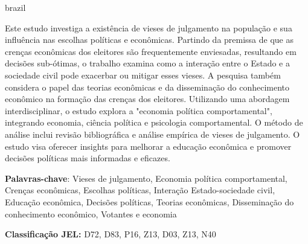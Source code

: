 \documentclass[
	article,
	12pt,
	oneside,
	a4paper,
	english,
	brazil,
	sumario=tradicional
]{abntex2}
\begin{document}
\renewcommand{\resumoname}{Resumo}
\begin{resumoumacoluna}
\begin{otherlanguage*}{brazil}
   \noindent 
      
   Este estudo investiga a existência de vieses de julgamento na população e sua influência nas escolhas políticas e econômicas. Partindo da premissa de que as crenças econômicas dos eleitores são frequentemente enviesadas, resultando em decisões sub-ótimas, o trabalho examina como a interação entre o Estado e a sociedade civil pode exacerbar ou mitigar esses vieses. A pesquisa também considera o papel das teorias econômicas e da disseminação do conhecimento econômico na formação das crenças dos eleitores. Utilizando uma abordagem interdisciplinar, o estudo explora a "economia política comportamental", integrando economia, ciência política e psicologia comportamental. O método de análise inclui revisão bibliográfica e análise empírica de vieses de julgamento. O estudo visa oferecer insights para melhorar a educação econômica e promover decisões políticas mais informadas e eficazes.

   \textbf{Palavras-chave}: Vieses de julgamento, Economia política comportamental, Crenças econômicas, Escolhas políticas, Interação Estado-sociedade civil, Educação econômica, Decisões políticas, Teorias econômicas, Disseminação do conhecimento econômico, Votantes e economia
   
   \textbf{Classificação JEL:} D72, D83, P16, Z13, D03, Z13, N40

 \end{otherlanguage*}  
\end{resumoumacoluna}

\newpage


\textual



\postextual
\renewcommand{\refname}{Referências}



%
\end{document}
